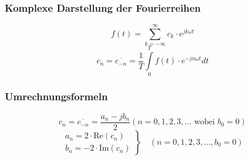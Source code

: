 \begin{minipage}{0.5\linewidth}
\subsubsection{Komplexe Darstellung der Fourierreihen}
$$f(t) = \sum\limits_{k = -\infty}^{\infty} c_k \cdot e^{j k \omega t}$$ 
$$c_n=\overline{c_{-n}}=\frac{1}{T}\int\limits_0^T{f(t)\cdot e^{-jn\omega t}dt}$$
\end{minipage}
\begin{minipage}{0.5\linewidth}
\subsubsection{Umrechnungsformeln}
    $$c_n=\overline{c_{-n}}=\frac{a_n-jb_n}{2} (n=0,1,2,3,\ldots\text{ wobei }b_0=0)$$
    $$
    \left.
    \begin{array}{l} 
    a_n=2 \cdot \text{Re}(c_n)\\
    b_n=-2 \cdot \text{Im}(c_n)
    \end{array}
    \right\} 
    \quad
    (n=0,1,2,3,\ldots, b_0 = 0)$$
\end{minipage}

